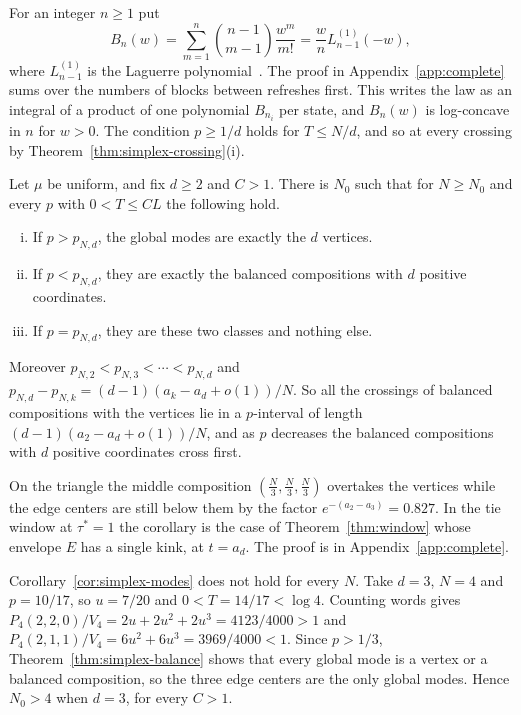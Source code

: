 For an integer $n\ge1$ put
\begin{equation}\label{eq:refresh-polynomial}
B_n(w)=\sum_{m=1}^n\binom{n-1}{m-1}\frac{w^m}{m!}
=\frac wn L^{(1)}_{n-1}(-w),
\end{equation}
where $L^{(1)}_{n-1}$ is the Laguerre polynomial~\cite[Eq.~18.5.12]{dlmf}. The proof
in Appendix~\ref{app:complete} sums over the numbers of blocks between refreshes first. This writes the law as an
integral of a product of one polynomial $B_{n_i}$ per state, and $B_n(w)$ is log-concave in $n$
for $w>0$. The condition
$p\ge1/d$ holds for $T\le N/d$, and so at every crossing by
Theorem~\ref{thm:simplex-crossing}(i).

\begin{corollary}\label{cor:simplex-modes}
Let $\mu$ be uniform, and fix $d\ge2$ and $C>1$. There is $N_0$ such that for $N\ge N_0$ and
every $p$ with $0<T\le CL$ the following hold.
\begin{enumerate}[(i)]
\item If $p>p_{N,d}$, the global modes are exactly the $d$ vertices.
\item If $p<p_{N,d}$, they are exactly the balanced compositions with $d$ positive
coordinates.
\item If $p=p_{N,d}$, they are these two classes and nothing else.
\end{enumerate}
Moreover $p_{N,2}<p_{N,3}<\cdots<p_{N,d}$ and
$p_{N,d}-p_{N,k}=(d-1)(a_k-a_d+o(1))/N$. So all the crossings of balanced compositions with the
vertices lie in a $p$-interval of length $(d-1)(a_2-a_d+o(1))/N$, and as $p$ decreases the
balanced compositions with $d$ positive coordinates cross first.
\end{corollary}

On the triangle the middle composition
$(\frac N3,\frac N3,\frac N3)$ overtakes the vertices while the edge centers are still
below them by the factor $e^{-(a_2-a_3)}=0.827$.
In the tie window at $\tau^*=1$ the corollary is the case of Theorem~\ref{thm:window} whose envelope
$E$ has a single kink, at $t=a_d$. The proof is in Appendix~\ref{app:complete}.

\begin{remark}\label{rem:simplex-edge-mode}
Corollary~\ref{cor:simplex-modes} does not hold for every $N$. Take $d=3$, $N=4$ and
$p=10/17$, so $u=7/20$ and $0<T=14/17<\log4$. Counting words gives
$P_4(2,2,0)/V_4=2u+2u^2+2u^3=4123/4000>1$ and $P_4(2,1,1)/V_4=6u^2+6u^3=3969/4000<1$.
Since $p>1/3$, Theorem~\ref{thm:simplex-balance} shows that every global mode is a vertex or
a balanced composition, so the three edge centers are the only global modes. Hence $N_0>4$
when $d=3$, for every $C>1$.
\end{remark}

